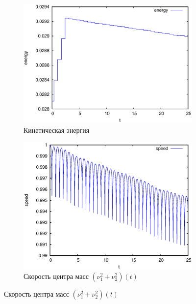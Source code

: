 \begin{figure}
    \centering
    \begin{subfigure}[t]{0.45\textwidth}
        \centering
        \includegraphics[width=\linewidth]{pic/rol__straight__kinetic_energy}
        \caption{Кинетическая энергия}
        \label{fig:rol__straight__kinetic_energy}
    \end{subfigure}
    \begin{subfigure}[t]{0.45\textwidth}
        \centering
        \includegraphics[width=\linewidth]{pic/rol__straight__speed_of_center_of_mass}
        \caption{Скорость центра масс $\left(\nu_1^2 + \nu_2^2\right)(t)$}
        \label{fig:rol__straight__speed_of_center_of_mass}
    \end{subfigure}
    \vspace{12pt}
    

\end{figure}
